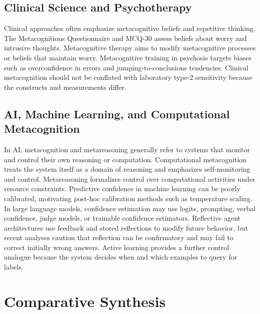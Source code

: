 \documentclass[a4paper]{article}
\begin{document}
   \subsection{Clinical Science and Psychotherapy}

   Clinical approaches often emphasize metacognitive beliefs and repetitive thinking. The Metacognitions Questionnaire and MCQ-30 assess beliefs about worry and intrusive thoughts. Metacognitive therapy aims to modify metacognitive processes or beliefs that maintain worry. Metacognitive training in psychosis targets biases such as overconfidence in errors and jumping-to-conclusions tendencies. Clinical metacognition should not be conflated with laboratory type-2 sensitivity because the constructs and measurements differ.

   \subsection{AI, Machine Learning, and Computational Metacognition}

   In AI, metacognition and metareasoning generally refer to systems that monitor and control their own reasoning or computation. Computational metacognition treats the system itself as a domain of reasoning and emphasizes self-monitoring and control. Metareasoning formalizes control over computational activities under resource constraints. Predictive confidence in machine learning can be poorly calibrated, motivating post-hoc calibration methods such as temperature scaling. In large language models, confidence estimation may use logits, prompting, verbal confidence, judge models, or trainable confidence estimators. Reflective agent architectures use feedback and stored reflections to modify future behavior, but recent analyses caution that reflection can be confirmatory and may fail to correct initially wrong answers. Active learning provides a further control analogue because the system decides when and which examples to query for labels.

   \section{Comparative Synthesis}
\end{document}
